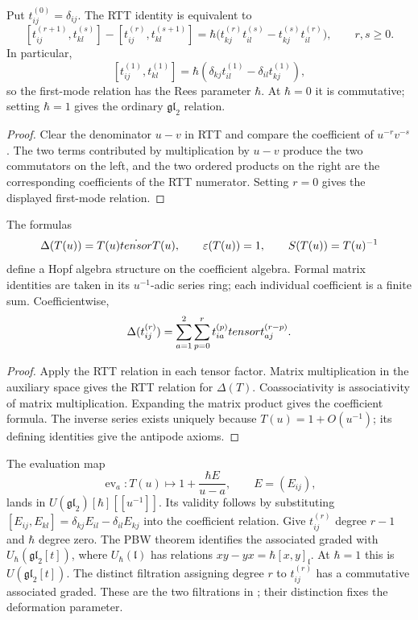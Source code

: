 \begin{proposition}
Put $t_{ij}^{(0)}=\delta_{ij}$. The RTT identity is equivalent to
\[
 [t_{ij}^{(r+1)},t_{kl}^{(s)}]-[t_{ij}^{(r)},t_{kl}^{(s+1)}]
 =\hbar\bigl(t_{kj}^{(r)}t_{il}^{(s)}-t_{kj}^{(s)}t_{il}^{(r)}\bigr),
 \qquad r,s\ge0.
\]
In particular,
\[
 [t_{ij}^{(1)},t_{kl}^{(1)}]
 =\hbar(\delta_{kj}t_{il}^{(1)}-\delta_{il}t_{kj}^{(1)}),
\]
so the first-mode relation has the Rees parameter $\hbar$. At $\hbar=0$ it is commutative; setting $\hbar=1$ gives the ordinary $\mathfrak{gl}_2$ relation.
\end{proposition}
\begin{proof}
Clear the denominator $u-v$ in RTT and compare the coefficient of $u^{-r}v^{-s}$. The two terms contributed by multiplication by $u-v$ produce the two commutators on the left, and the two ordered products on the right are the corresponding coefficients of the RTT numerator. Setting $r=0$ gives the displayed first-mode relation.
\end{proof}

\begin{theorem}
The formulas
\[
 \Delta(T(u))=T(u)\dot{tensor} T(u),\qquad
 \varepsilon(T(u))=1,\qquad
 S(T(u))=T(u)^{-1}
\]
define a Hopf algebra structure on the coefficient algebra. Formal matrix identities are taken in its $u^{-1}$-adic series ring; each individual coefficient is a finite sum. Coefficientwise,
\[
 \Delta(t_{ij}^{(r)})
 =\sum_{a=1}^{2}\sum_{p=0}^{r}
 t_{ia}^{(p)}tensor t_{aj}^{(r-p)}.
\]
\end{theorem}
\begin{proof}
Apply the RTT relation in each tensor factor. Matrix multiplication in the auxiliary space gives the RTT relation for $\Delta(T)$. Coassociativity is associativity of matrix multiplication. Expanding the matrix product gives the coefficient formula. The inverse series exists uniquely because $T(u)=1+O(u^{-1})$; its defining identities give the antipode axioms.
\end{proof}

The evaluation map
\[
 \operatorname{ev}_a:T(u)\longmapsto 1+\frac{\hbar E}{u-a},
 \qquad E=(E_{ij}),
\]
lands in $U(\mathfrak{gl}_2)[\hbar][[u^{-1}]]$.
Its validity follows by substituting $[E_{ij},E_{kl}]=\delta_{kj}E_{il}-\delta_{il}E_{kj}$
into the coefficient relation.
Give $t_{ij}^{(r)}$ degree $r-1$ and $\hbar$ degree zero.
The PBW theorem identifies the associated graded with
$U_\hbar(\mathfrak{gl}_2[t])$, where $U_\hbar(\mathfrak l)$ has relations
$xy-yx=\hbar[x,y]_{\mathfrak l}$.
At $\hbar=1$ this is $U(\mathfrak{gl}_2[t])$.
The distinct filtration assigning degree $r$ to $t_{ij}^{(r)}$ has a commutative
associated graded. These are the two filtrations in
\cite[Sections~1.16--1.27]{MNOYangians}; their distinction fixes the deformation parameter.

